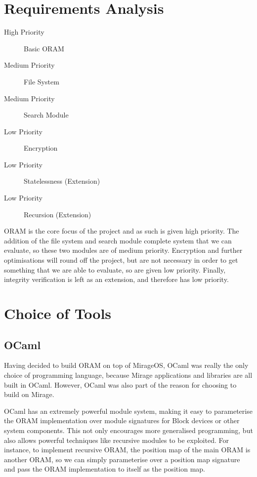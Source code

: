 \documentclass[12pt,a4paper,twoside,openright]{report}
\begin{document}
\section{Requirements Analysis}

\begin{description}
	\item [High Priority] Basic ORAM
	\item [Medium Priority] File System
	\item [Medium Priority] Search Module
	\item [Low Priority] Encryption
	\item [Low Priority] Statelessness (Extension)
	\item [Low Priority] Recursion (Extension)
\end{description}

ORAM is the core focus of the project and as such is given high priority. The addition of the file system and search module complete system that we can evaluate, so these two modules are of medium priority. Encryption and further optimisations will round off the project, but are not necessary in order to get something that we are able to evaluate, so are given low priority. Finally, integrity verification is left as an extension, and therefore has low priority.

\section{Choice of Tools}

\subsection{OCaml}

Having decided to build ORAM on top of MirageOS, OCaml was really the only choice of programming language, because Mirage applications and libraries are all built in OCaml. However, OCaml was also part of the reason for choosing to build on Mirage.

OCaml has an extremely powerful module system, making it easy to parameterise the ORAM implementation over module signatures for Block devices or other system components. This not only encourages more generalised programming, but also allows powerful techniques like recursive modules to be exploited. For instance, to implement recursive ORAM, the position map of the main ORAM is another ORAM, so we can simply parameterise over a position map signature and pass the ORAM implementation to itself as the position map.
\end{document}
